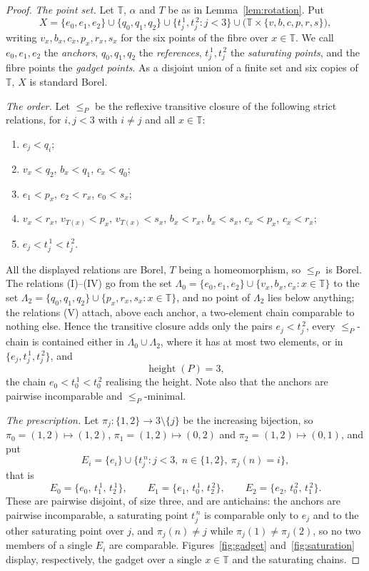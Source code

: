 \documentclass[11pt,reqno]{amsart}
\theoremstyle{plain}
\theoremstyle{definition}
\theoremstyle{remark}
\newcommand{\hgt}{\operatorname{height}}
\newcommand{\T}{\mathbb T}
\begin{document}
\begin{proof}
\emph{The point set.} Let $\T$, $\alpha$ and $T$ be as in
Lemma~\ref{lem:rotation}. Put
\[
X=\{e_0,e_1,e_2\}\cup\{q_0,q_1,q_2\}
\cup\{t_j^{\,1},t_j^{\,2}:j<3\}
\cup\bigl(\T\times\{v,b,c,p,r,s\}\bigr),
\]
writing $v_x,b_x,c_x,p_x,r_x,s_x$ for the six points of the fibre over
$x\in\T$. We call $e_0,e_1,e_2$ the \emph{anchors}, $q_0,q_1,q_2$ the
\emph{references}, $t_j^{\,1},t_j^{\,2}$ the \emph{saturating points}, and the
fibre points the \emph{gadget points}. As a disjoint union of a finite set and
six copies of $\T$, $X$ is standard Borel.

\emph{The order.} Let $\le_P$ be the reflexive transitive closure of the
following strict relations, for $i,j<3$ with $i\neq j$ and all $x\in\T$:
\begin{enumerate}
\item[(I)] $e_j<q_i$;
\item[(II)] $v_x<q_2$, \quad $b_x<q_1$, \quad $c_x<q_0$;
\item[(III)] $e_1<p_x$, \quad $e_2<r_x$, \quad $e_0<s_x$;
\item[(IV)] $v_x<r_x$, \quad $v_{T(x)}<p_x$, \quad $v_{T(x)}<s_x$, \quad
$b_x<r_x$, \quad $b_x<s_x$, \quad $c_x<p_x$, \quad $c_x<r_x$;
\item[(V)] $e_j<t_j^{\,1}<t_j^{\,2}$.
\end{enumerate}
All the displayed relations are Borel, $T$ being a homeomorphism, so $\le_P$
is Borel. The relations (I)--(IV) go from the set
$\Lambda_0=\{e_0,e_1,e_2\}\cup\{v_x,b_x,c_x:x\in\T\}$ to the set
$\Lambda_2=\{q_0,q_1,q_2\}\cup\{p_x,r_x,s_x:x\in\T\}$, and no point of
$\Lambda_2$ lies below anything; the relations (V) attach, above each anchor,
a two-element chain comparable to nothing else. Hence the transitive closure
adds only the pairs $e_j<t_j^{\,2}$, every $\le_P$-chain is contained either
in $\Lambda_0\cup\Lambda_2$, where it has at most two elements, or in
$\{e_j,t_j^{\,1},t_j^{\,2}\}$, and
\[
\hgt(P)=3,
\]
the chain $e_0<t_0^{\,1}<t_0^{\,2}$ realising the height. Note also that the
anchors are pairwise incomparable and $\le_P$-minimal.

\emph{The prescription.} Let $\pi_j:\{1,2\}\to3\setminus\{j\}$ be the
increasing bijection, so
$\pi_0=(1,2)\mapsto(1,2)$, $\pi_1=(1,2)\mapsto(0,2)$ and
$\pi_2=(1,2)\mapsto(0,1)$, and put
\[
E_i=\{e_i\}\cup\{t_j^{\,n}:j<3,\ n\in\{1,2\},\ \pi_j(n)=i\},
\]
that is
\[
E_0=\{e_0,\,t_1^{\,1},\,t_2^{\,1}\},\qquad
E_1=\{e_1,\,t_0^{\,1},\,t_2^{\,2}\},\qquad
E_2=\{e_2,\,t_0^{\,2},\,t_1^{\,2}\}.
\]
These are pairwise disjoint, of size three, and are antichains: the anchors
are pairwise incomparable, a saturating point $t_j^{\,n}$ is comparable only
to $e_j$ and to the other saturating point over $j$, and $\pi_j(n)\neq j$
while $\pi_j(1)\neq\pi_j(2)$, so no two members of a single $E_i$ are
comparable. Figures~\ref{fig:gadget} and~\ref{fig:saturation} display,
respectively, the gadget over a single $x\in\T$ and the saturating chains.


\end{proof}
\end{document}
